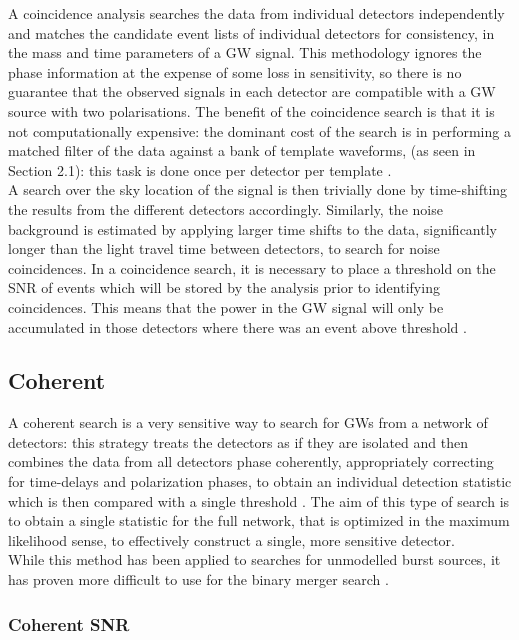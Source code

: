 \documentclass[binding=0.6cm, LaM]{sapthesis}
\begin{document}
	A coincidence analysis searches the data from individual detectors independently 	
	and matches the candidate event lists of individual detectors for consistency,
	in the mass and time parameters of a GW signal.
	This methodology ignores the phase information at the expense of some loss in sensitivity, 
	so there is no guarantee that the observed signals in each detector 
	are compatible with a GW source with two polarisations.
	The benefit of the coincidence search is that it is not computationally expensive: 
	the dominant cost of the search is in performing a matched filter 
	of the data against a bank of template waveforms, (as seen in Section 2.1):
        this task is done once per detector per template \cite{28, 45}. \\
	A search over the sky location of the signal is then trivially done 
	by time-shifting the results from the different detectors accordingly.
        Similarly, the noise background is estimated by applying larger time shifts to the data,
        significantly longer than the light travel time between detectors, to search for noise coincidences.
        In a coincidence search, it is necessary to place a threshold on the SNR of events
        which will be stored by the analysis prior to identifying coincidences.
        This means that the power in the GW signal will only be accumulated
	in those detectors where there was an event above threshold \cite{45}.

\subsection{Coherent}

	A coherent search is a very sensitive way to search for GWs from a network of detectors:
	this strategy treats the detectors as if they are isolated 
	and then combines the data from all detectors phase coherently, 
	appropriately correcting for time-delays and polarization phases, 
	to obtain an individual detection statistic which is then compared with a single threshold \cite{18}. 
	The aim of this type of search is to obtain a single statistic for the full 
	network, that is optimized in the maximum likelihood sense, 
	to effectively construct a single, more sensitive detector. \\
 	While this method has been applied to searches for unmodelled burst sources,
        it has proven more difficult to use for the binary merger search \cite{45}.

\subsubsection{Coherent SNR}
	
\end{document}
